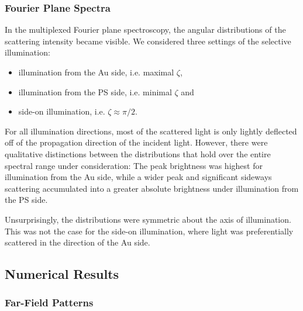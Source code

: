 \documentclass[10pt]{article}
\begin{document}
\begin{multicols}{2}
\subsubsection*{Fourier Plane Spectra}

In the multiplexed Fourier plane spectroscopy, the angular distributions of the scattering intensity became visible. 
We considered three settings of the selective illumination: 
\begin{itemize}
    \item illumination from the Au side, i.e. maximal $\zeta$,
    \item illumination from the PS side, i.e. minimal $\zeta$ and
    \item side-on illumination, i.e. $\zeta \approx \pi/2$.
\end{itemize}

For all illumination directions, most of the scattered light is only lightly deflected off of the propagation direction of the incident light. 
However, there were qualitative distinctions between the distributions that hold over the entire spectral range under consideration:
The peak brightness was highest for illumination from the Au side, while a wider peak and significant sideways scattering accumulated into a greater absolute brightness under illumination from the PS side. 

Unsurprisingly, the distributions were symmetric about the axis of illumination. 
This was not the case for the side-on illumination, where light was preferentially scattered in the direction of the Au side. 








\subsection*{Numerical Results}


\subsubsection*{Far-Field Patterns}


\end{multicols}
\end{document}
